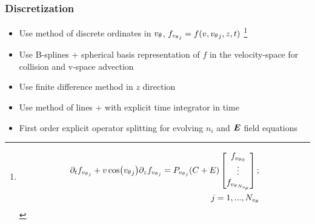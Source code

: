 \documentclass[landscape,archE,fontscale=0.285]{baposter} %
\begin{document}
\begin{poster}
{\subsubsection*{Discretization}
\begin{itemize}
	\item Use method of discrete ordinates in ${v_{\theta}}$, $f_{{v_{\theta}}_j} = f(v, {v_{\theta}}_j, z, t)$
	\footnote{
	\begin{align}
		\partial_t f_{\vtheta_j} + v\cos\of{\vtheta_j} \partial_z f_{\vtheta_j} = P_{\vtheta_j} (C + E) \begin{bmatrix}
			f_{\vtheta_0}\\
			\vdots\\
			f_{\vtheta_{N_\vtheta}}\\
		\end{bmatrix} ; \\
		j=1,..., N_{\vtheta} \nonumber
	\end{align}}
	\item Use B-splines + spherical basis representation of $f$ in the velocity-space for collision and v-space advection
	\item Use finite difference method in $z$ direction
	\item Use method of lines + with explicit time integrator in time
	\item First order explicit operator splitting for evolving $n_i$ and $\boldsymbol{E}$ field equations
\end{itemize}
}





\end{poster}
\end{document}
